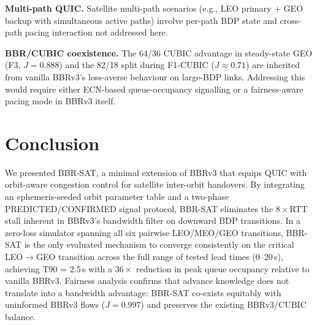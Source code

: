 \documentclass[conference]{IEEEtran}
\begin{document}
\textbf{Multi-path QUIC.}
Satellite multi-path scenarios (e.g., LEO primary + GEO backup with
simultaneous active paths) involve per-path BDP state and
cross-path pacing interaction not addressed here.

\textbf{BBR/CUBIC coexistence.}
The 64/36 CUBIC advantage in steady-state GEO (F3, $J = 0.888$) and
the 82/18 split during F1-CUBIC ($J \approx 0.71$) are inherited from
vanilla BBRv3's loss-averse behaviour on large-BDP links.
Addressing this would require either ECN-based queue-occupancy signalling
or a fairness-aware pacing mode in BBRv3 itself.

\section{Conclusion}
\label{sec:conclusion}

We presented BBR-SAT, a minimal extension of BBRv3 that equips QUIC
with orbit-aware congestion control for satellite inter-orbit handovers.
By integrating an ephemeris-seeded orbit parameter table and a two-phase
PREDICTED/CONFIRMED signal protocol, BBR-SAT eliminates the $8 \times$RTT
stall inherent in BBRv3's bandwidth filter on downward BDP transitions.
In a zero-loss simulator spanning all six pairwise LEO/MEO/GEO transitions,
BBR-SAT is the only evaluated mechanism to converge consistently on the
critical LEO$\to$GEO transition across the full range of tested lead times
(0--20\,s), achieving T90 = 2.5\,s with a $36\times$ reduction in peak
queue occupancy relative to vanilla BBRv3.
Fairness analysis confirms that advance knowledge does not translate into
a bandwidth advantage: BBR-SAT co-exists equitably with uninformed BBRv3
flows ($J = 0.997$) and preserves the existing BBRv3/CUBIC balance.



\end{document}
